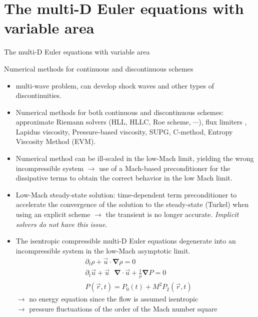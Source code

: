 \documentclass[xcolor=dvipsnames,10pt]{beamer}
\renewcommand{\div}{\boldsymbol{\nabla}\! \cdot \!}
\newcommand{\grad}{\boldsymbol{\nabla}}
\begin{document}
\section{The multi-D Euler equations with variable area}
\begin{frame}
\begin{center}
The multi-D Euler equations with variable area
\end{center}
\end{frame}
\begin{frame}
\begin{block}{Numerical methods for continuous and discontinuous schemes}
\begin{itemize}
\setlength{\itemsep}{10pt}
\item multi-wave problem, can develop shock waves and other types of discontinuities. 
\item Numerical methods for both continuous and discontinuous schemes: approximate Riemann solvers (HLL, HLLC, Roe scheme, $\cdots$), flux limiters
, Lapidus viscosity, Pressure-based viscosity, SUPG, C-method, Entropy Viscosity Method (EVM). 
\item Numerical method can be ill-scaled in the low-Mach limit, yielding the wrong incompressible system $\to$ use of a Mach-based preconditioner for the dissipative terms to obtain the correct behavior in the low Mach limit.
\item Low-Mach steady-state solution: time-dependent term preconditioner to accelerate the convergence of the solution to the steady-state (Turkel) when using an explicit scheme $\to$ the transient is no longer accurate. \emph{Implicit solvers do not have this issue}. 
\end{itemize}
\end{block}
\end{frame}
\begin{frame}
\begin{block}{}
\begin{itemize}
\setlength{\itemsep}{10pt}
\item The isentropic compressible multi-D Euler equations degenerate into an incompressible system in the low-Mach asymptotic limit.
\begin{align}
&\partial_t \rho + \vec{u} \cdot \grad \rho = 0 \nonumber \\
&\partial_t \vec{u} + \vec{u}\text{ } \div \vec{u} + \frac{1}{\rho}\grad P = 0 \nonumber \\
&P( \vec{r},t) = P_0(t) + M^2 P_2(\vec{r},t)\nonumber
\end{align}
$\to$ no energy equation since the flow is assumed isentropic \\
$\to$ pressure fluctuations of the order of the Mach number square
\end{itemize}
\end{block}
\end{frame}
\end{document}
